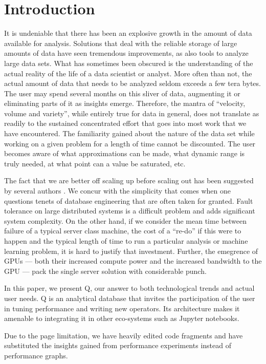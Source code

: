 \section{Introduction}

It is undeniable that there has been an explosive growth in the 
amount of data available for analysis. Solutions that 
deal with the reliable storage of large amounts of data have seen tremendous
improvements, as also tools to analyze large data sets. What has sometimes been
obscured is the understanding of the actual reality of the life of a data
scientist or analyst. More often than not, the actual amount of data that needs
to be analyzed seldom exceeds a few tera bytes\cite{Dittrich2015}. The user may spend
several months on this sliver of data, augmenting it or eliminating parts of it
as insights emerge. Therefore, the mantra of ``velocity, volume and variety'',
while entirely true for data in general, does not translate as readily to the
sustained concentrated effort that goes into most work that we have
encountered. The familiarity gained about the nature of the data set 
while working on a given problem for a length of time cannot be discounted. The
user becomes aware of what approximations can be made, what dynamic range is
truly needed, at what point can a value be saturated, etc.

The fact that we are better off scaling up before scaling out has been suggested
by several authors \cite{Rowstron2012,Dittrich2015}. We concur with the simplicity
that comes when one questions tenets of database engineering that are often
taken for granted. Fault tolerance on large distributed systems is a difficult
problem and adds significant system complexity. On the other hand, if we
consider the mean time between failure of a typical server class machine, the
cost of a ``re-do'' if this were to happen and the typical length of time to run
a particular analysis or machine learning problem, it is hard to justify that
investment. 
Further, the emegrence of GPUs --- both their increased compute power and the
increased  bandwidth to the GPU --- pack the single server solution with
considerable punch.

In this paper, we present Q, our answer to both technological trends and actual
user needs. Q is an analytical database that invites the participation of the
user in tuning performance and writing new operators. Its architecture makes it
amenable to integrating it in other eco-systems such as Jupyter notebooks.

Due to the page limitation, we have heavily edited code fragments and
have substituted the insights gained from performance experiments instead of
performance graphs.
